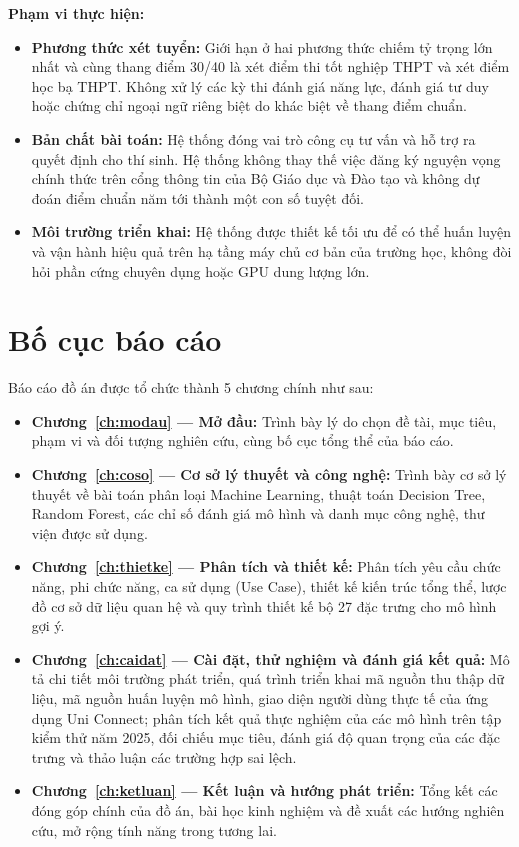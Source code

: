 \textbf{Phạm vi thực hiện:}
\begin{itemize}[leftmargin=1.6em, itemsep=2pt]
  \item \textbf{Phương thức xét tuyển:} Giới hạn ở hai phương thức chiếm tỷ trọng lớn nhất và cùng thang điểm 30/40 là xét điểm thi tốt nghiệp THPT và xét điểm học bạ THPT. Không xử lý các kỳ thi đánh giá năng lực, đánh giá tư duy hoặc chứng chỉ ngoại ngữ riêng biệt do khác biệt về thang điểm chuẩn.
  \item \textbf{Bản chất bài toán:} Hệ thống đóng vai trò công cụ tư vấn và hỗ trợ ra quyết định cho thí sinh. Hệ thống không thay thế việc đăng ký nguyện vọng chính thức trên cổng thông tin của Bộ Giáo dục và Đào tạo và không dự đoán điểm chuẩn năm tới thành một con số tuyệt đối.
  \item \textbf{Môi trường triển khai:} Hệ thống được thiết kế tối ưu để có thể huấn luyện và vận hành hiệu quả trên hạ tầng máy chủ cơ bản của trường học, không đòi hỏi phần cứng chuyên dụng hoặc GPU dung lượng lớn.
\end{itemize}

\section{Bố cục báo cáo}

Báo cáo đồ án được tổ chức thành 5 chương chính như sau:
\begin{itemize}[leftmargin=1.6em, itemsep=2pt]
  \item \textbf{Chương~\ref{ch:modau} — Mở đầu:} Trình bày lý do chọn đề tài, mục tiêu, phạm vi và đối tượng nghiên cứu, cùng bố cục tổng thể của báo cáo.
  \item \textbf{Chương~\ref{ch:coso} — Cơ sở lý thuyết và công nghệ:} Trình bày cơ sở lý thuyết về bài toán phân loại Machine Learning, thuật toán Decision Tree, Random Forest, các chỉ số đánh giá mô hình và danh mục công nghệ, thư viện được sử dụng.
  \item \textbf{Chương~\ref{ch:thietke} — Phân tích và thiết kế:} Phân tích yêu cầu chức năng, phi chức năng, ca sử dụng (Use Case), thiết kế kiến trúc tổng thể, lược đồ cơ sở dữ liệu quan hệ và quy trình thiết kế bộ 27 đặc trưng cho mô hình gợi ý.
  \item \textbf{Chương~\ref{ch:caidat} — Cài đặt, thử nghiệm và đánh giá kết quả:} Mô tả chi tiết môi trường phát triển, quá trình triển khai mã nguồn thu thập dữ liệu, mã nguồn huấn luyện mô hình, giao diện người dùng thực tế của ứng dụng Uni Connect; phân tích kết quả thực nghiệm của các mô hình trên tập kiểm thử năm 2025, đối chiếu mục tiêu, đánh giá độ quan trọng của các đặc trưng và thảo luận các trường hợp sai lệch.
  \item \textbf{Chương~\ref{ch:ketluan} — Kết luận và hướng phát triển:} Tổng kết các đóng góp chính của đồ án, bài học kinh nghiệm và đề xuất các hướng nghiên cứu, mở rộng tính năng trong tương lai.
\end{itemize}
